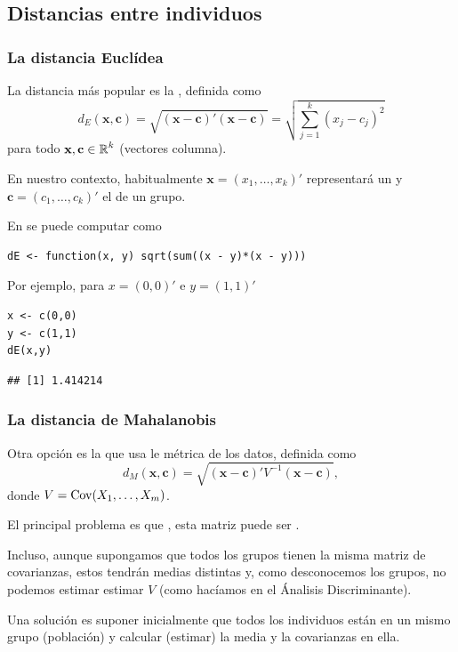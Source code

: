 \subsection{Distancias entre individuos}
\subsubsection{La distancia Euclídea}
La distancia más popular es la , definida como \[ d_E(\mathbf{x,c})=\sqrt{(\mathbf{x-c})'(\mathbf{x-c})}=\sqrt{\sum_{j=1}^{k}(x_j-c_j)^2} \]para todo $\mathbf{x,c}\in\operatorname{\mathbb{R}}^k$ (vectores columna).

En nuestro contexto, habitualmente $\mathbf{x}=(x_1,\dots,x_k)'$ representará un  y $\mathbf{c}=(c_1,\dots,c_k)'$ el  de un grupo.

En  se puede computar como 
\begin{lstlisting}
dE <- function(x, y) sqrt(sum((x - y)*(x - y)))
\end{lstlisting}
Por ejemplo, para $x=(0,0)'$ e $y=(1,1)'$
\begin{lstlisting}
x <- c(0,0)
y <- c(1,1)
dE(x,y)
\end{lstlisting}
\begin{verbatim}
## [1] 1.414214
\end{verbatim}
\subsubsection{La distancia de Mahalanobis}
Otra opción es la  que usa le métrica de los datos, definida como \[ d_M(\mathbf{x,c})=\sqrt{(\mathbf{x-c})'V^{-1}(\mathbf{x-c})}, \]donde $V=\operatorname{Cov}(X_1,\dots,X_m)$.

El principal problema es que , esta matriz puede ser .

Incluso, aunque supongamos que todos los grupos tienen la misma matriz de covarianzas, estos tendrán medias distintas y, como desconocemos los grupos, no podemos estimar estimar $V$ (como hacíamos en el Ánalisis Discriminante).

Una solución es suponer inicialmente que todos los individuos están en un mismo grupo (población) y calcular (estimar) la media y la covarianzas en ella.

